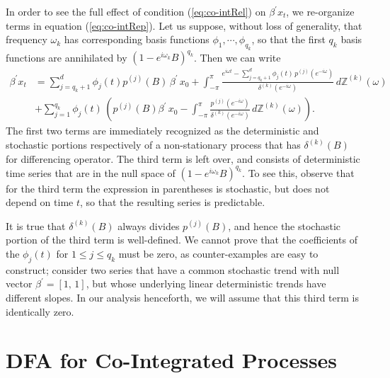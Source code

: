 \documentclass[a4paper]{book}
\def\ZZ{\mathbb Z}
\begin{document}
In order to see the full effect of condition
 (\ref{eq:co-intRel}) on $\beta^{\prime} x_t$, we re-organize terms
 in equation (\ref{eq:co-intRep}).  Let us suppose, without loss of
 generality, that frequency $\omega_k$ has corresponding basis
 functions $\phi_1, \cdots, \phi_{q_k}$, so that the first $q_k$
 basis functions are annihilated by ${(1 - e^{i \omega_k}
 B)}^{q_k}$.  Then we can write
\begin{align*}
 \beta^{\prime} x_t & = \sum_{j= q_k + 1}^d \phi_j (t) p^{(j)} (B) \, \beta^{\prime} \, x_{0}
  + \int_{-\pi}^{\pi} \frac{ e^{i \omega t} - \sum_{j= q_k + 1}^d \phi_j (t) \, p^{(j)} ( e^{-i \omega
 } )}{ \delta^{(k)} (e^{-i \omega}) } \, d \ZZ^{(k)}
 (\omega) \\
 & + \sum_{j=1}^{q_k} \phi_j (t) \,  \left(p^{(j)}
 (B)  \beta^{\prime} \,  x_0 - \int_{-\pi}^{\pi} \frac{ p^{(j)} (e^{-i \omega}) }{
 \delta^{(k)} (e^{-i \omega}) } \, d\ZZ^{(k)} (\omega) \right).
\end{align*}
 The first two terms are immediately recognized as the deterministic
 and stochastic portions respectively of a non-stationary process
 that has $\delta^{(k)} (B)$ for differencing operator.  The third
 term is left over, and consists of deterministic time series that
 are in the null space of ${(1 - e^{i \omega_k}
 B)}^{q_k}$.  To see this, observe that for the third term the expression in parentheses is
stochastic, but does not depend on time $t$, so that the resulting series is predictable.


 It is true that $\delta^{(k)} (B)$
 always divides $p^{(j)} (B)$, and hence the stochastic portion of
 the third term is well-defined.  We cannot prove that the
 coefficients of the $\phi_j (t)$ for $1 \leq j \leq q_k$ must be
 zero, as counter-examples are easy to construct; consider two series that
 have a common stochastic trend with null vector $\beta^{\prime} =
 [1, \, 1]$, but whose underlying linear deterministic trends have
different slopes.  
  In our analysis henceforth, we
 will assume that this third term is identically zero.

\section{DFA for Co-Integrated Processes}
\end{document}
